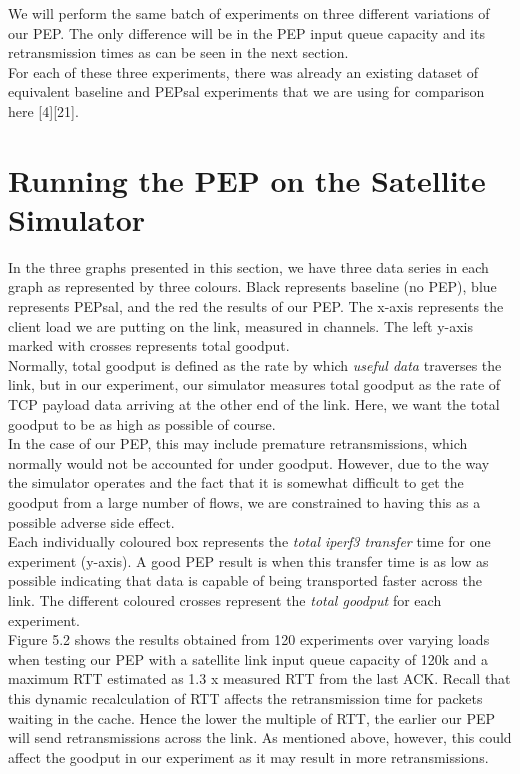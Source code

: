 \documentclass{uathesis}
\begin{document}
We will perform the same batch of experiments on three different variations of our PEP. The only difference will be in the PEP input queue capacity and its retransmission times as can be seen in the next section.\\

For each of these three experiments, there was already an existing dataset of equivalent baseline and PEPsal experiments that we are using for comparison here [4][21]. 

\section{Running the PEP on the Satellite Simulator}
In the three graphs presented in this section, we have three data series in each graph as represented by three colours. Black represents baseline (no PEP), blue represents PEPsal, and the red the results of our PEP. The x-axis represents the client load we are putting on the link, measured in channels. The left y-axis marked with crosses represents total goodput. \\

Normally, total goodput is defined as the rate by which \emph{useful data} traverses the link, but in our experiment, our simulator measures total goodput as the rate of TCP payload data arriving at the other end of the link. Here, we want the total goodput to be as high as possible of course. \\

In the case of our PEP, this may include premature retransmissions, which normally would not be accounted for under goodput. However, due to the way the simulator operates and the fact that it is somewhat difficult to get the goodput from a large number of flows, we are constrained to having this as a possible adverse side effect. \\

Each individually coloured box represents the \emph{total iperf3 transfer} time for one experiment (y-axis). A good PEP result is when this transfer time is as low as possible indicating that data is capable of being transported faster across the link. The different coloured crosses represent the \emph{total goodput} for each experiment.\\

Figure 5.2 shows the results obtained from 120 experiments over varying loads when testing our PEP with a satellite link input queue capacity of 120k and a maximum RTT estimated as 1.3 x measured RTT from the last ACK. Recall that this dynamic recalculation of RTT affects the retransmission time for packets waiting in the cache. Hence the lower the multiple of RTT, the earlier our PEP will send retransmissions across the link. As mentioned above, however, this could affect the goodput in our experiment as it may result in more retransmissions.\\
\end{document}
